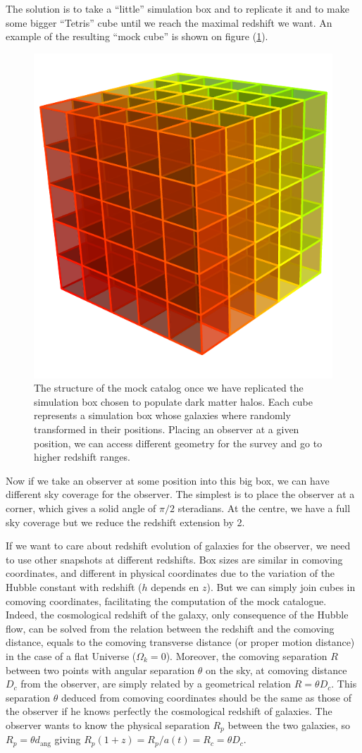The solution is to take a ``little'' simulation box and to replicate it and to
make some bigger ``Tetris'' cube until we reach the maximal redshift we want.
An example of the resulting ``mock cube'' is shown on figure
(\ref{fig:cubemock}).
%
\begin{figure}
    \centering
    \includegraphics[width=0.5\linewidth]{figures/mock/mock}
    \caption{The structure of the mock catalog once we have replicated the
        simulation box chosen to populate dark matter halos. Each cube
        represents a simulation box whose galaxies where randomly
        transformed in their positions. Placing an observer at a given
        position, we can access different geometry for the survey and go to
    higher redshift ranges.\label{fig:cubemock}}%
\end{figure}

Now if we take an observer at some position into this big box, we can have
different sky coverage for the observer. The simplest is to place the observer
at a corner, which gives a solid angle of $\pi/2$ steradians. At the centre,
we have a full sky coverage but we reduce the redshift extension by 2.

If we want to care about redshift evolution of galaxies for the observer, we
need to use other snapshots at different redshifts. Box sizes are similar in
comoving coordinates, and different in physical coordinates due to the
variation of the Hubble constant with redshift ($h$ depends en $z$). But we
can simply join cubes in comoving coordinates, facilitating the computation
of the mock catalogue. Indeed, the cosmological redshift of the galaxy, only
consequence of the Hubble flow, can be solved from the relation between the
redshift and the comoving distance, equals to the comoving transverse
distance (or proper motion distance) in the case of a flat Universe
($\Omega_k=0$). Moreover, the comoving separation $R$ between two points
with angular separation $\theta$ on the sky, at comoving distance $D_c$ from
the observer, are simply related by a geometrical relation $R=\theta D_c$.
This separation $\theta$ deduced from comoving coordinates should be the
same as those of the observer if he knows perfectly the cosmological
redshift of galaxies. The observer wants to know the physical separation
$R_p$ between the two galaxies, so $R_p=\theta d_\mathrm{ang}$ giving
$R_p \left(1+z\right)= R_p/a\left(t\right)=R_c=\theta D_c$.
%

